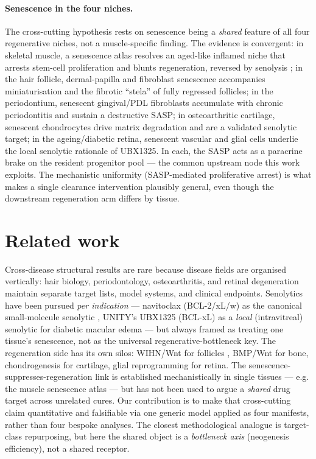 \documentclass[11pt,a4paper]{article}
\begin{document}
\paragraph{Senescence in the four niches.} The cross-cutting hypothesis rests on senescence
being a \emph{shared} feature of all four regenerative niches, not a muscle-specific finding.
The evidence is convergent: in skeletal muscle, a senescence atlas resolves an aged-like
inflamed niche that arrests stem-cell proliferation and blunts regeneration, reversed by
senolysis \citep{moiseeva2023}; in the hair follicle, dermal-papilla and fibroblast senescence
accompanies miniaturisation and the fibrotic ``stela'' of fully regressed follicles; in the
periodontium, senescent gingival/PDL fibroblasts accumulate with chronic periodontitis and
sustain a destructive SASP; in osteoarthritic cartilage, senescent chondrocytes drive matrix
degradation and are a validated senolytic target; in the ageing/diabetic retina, senescent
vascular and glial cells underlie the local senolytic rationale of UBX1325. In each, the SASP
acts as a paracrine brake on the resident progenitor pool --- the common upstream node this
work exploits. The mechanistic uniformity (SASP-mediated proliferative arrest) is what makes a
single clearance intervention plausibly general, even though the downstream regeneration arm
differs by tissue.

\section{Related work}
\label{sec:related}
Cross-disease structural results are rare because disease fields are organised vertically:
hair biology, periodontology, osteoarthritis, and retinal degeneration maintain separate
target lists, model systems, and clinical endpoints. Senolytics have been pursued
\emph{per indication} --- navitoclax (BCL-2/xL/w) as the canonical small-molecule senolytic
\citep{he2020}, UNITY's UBX1325 (BCL-xL) as a \emph{local} (intravitreal) senolytic for
diabetic macular edema --- but always framed as treating one tissue's senescence, not as the
universal regenerative-bottleneck key. The regeneration side has its own silos: WIHN/Wnt for
follicles \citep{ito2007}, BMP/Wnt for bone, chondrogenesis for cartilage, glial
reprogramming for retina. The senescence-suppresses-regeneration link is established
mechanistically in single tissues --- e.g. the muscle senescence atlas \citep{moiseeva2023}
--- but has not been used to argue a \emph{shared} drug target across unrelated cures. Our
contribution is to make that cross-cutting claim quantitative and falsifiable via one generic
model applied as four manifests, rather than four bespoke analyses. The closest methodological
analogue is target-class repurposing, but here the shared object is a \emph{bottleneck axis}
(neogenesis efficiency), not a shared receptor.
\end{document}
